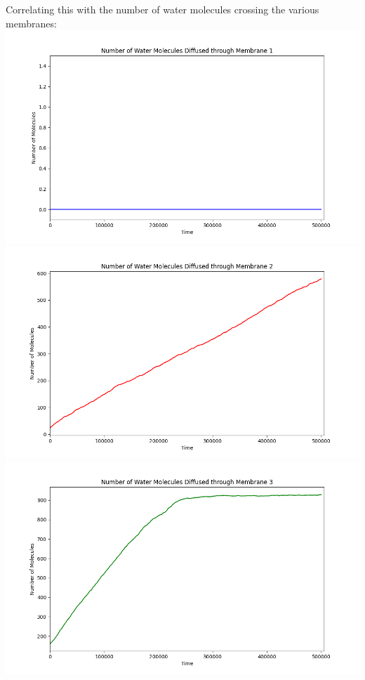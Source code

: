 \documentclass[11pt]{article}
\begin{document}
Correlating this with the number of water molecules crossing the various membranes: \\
\includegraphics[scale=0.5]{Q5M1_Water.png} \\
\includegraphics[scale=0.5]{Q5M2_Water.png} \\
\includegraphics[scale=0.5]{Q5M3_water.png} \\
\end{document}
